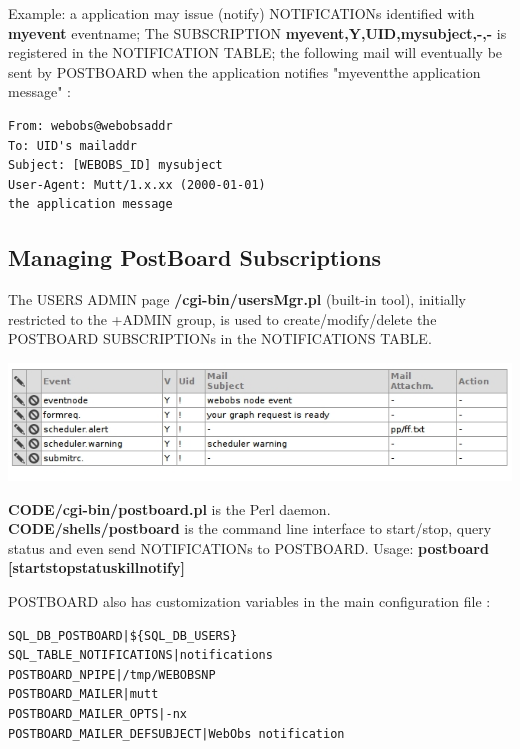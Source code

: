 Example: a \webobs application may issue (notify) NOTIFICATIONs identified with \textbf{myevent} eventname;  
The SUBSCRIPTION \textbf{myevent,Y,UID,mysubject,-,-} is registered in the NOTIFICATION TABLE; the following mail will 
eventually be sent by POSTBOARD when the application notifies "myevent\textbar \textbar the application message" : 

\begin{lstlisting}[title=mail for myevent notification]
From: webobs@webobsaddr
To: UID's mailaddr
Subject: [WEBOBS_ID] mysubject
User-Agent: Mutt/1.x.xx (2000-01-01)
the application message 
\end{lstlisting}


\subsection{Managing PostBoard Subscriptions}

The USERS ADMIN page \textbf{/cgi-bin/usersMgr.pl} (built-in tool), initially restricted to the +ADMIN group, is used to create/modify/delete  
the POSTBOARD SUBSCRIPTIONs in the NOTIFICATIONS TABLE.

\includegraphics[width=.8\textwidth]{figures/subscriptions.png}

\textbf{CODE/cgi-bin/postboard.pl} is the Perl daemon.\\ 
\textbf{CODE/shells/postboard} is the command line interface 
to start/stop, query status and even send NOTIFICATIONs to POSTBOARD. 
Usage: \textbf{postboard [start\textbar stop\textbar status\textbar kill\textbar notify] }

POSTBOARD also has customization variables in the main configuration file :

\begin{lstlisting}[title=\wofile{WEBOBS.rc} (excerpt)]
SQL_DB_POSTBOARD|${SQL_DB_USERS}
SQL_TABLE_NOTIFICATIONS|notifications
POSTBOARD_NPIPE|/tmp/WEBOBSNP
POSTBOARD_MAILER|mutt
POSTBOARD_MAILER_OPTS|-nx
POSTBOARD_MAILER_DEFSUBJECT|WebObs notification
\end{lstlisting}

